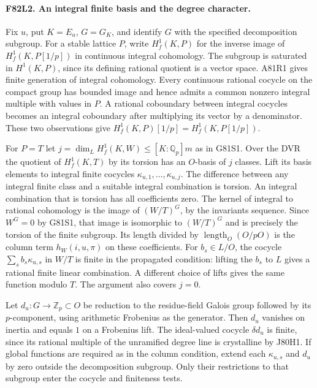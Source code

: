 \paragraph{F82L2. An integral finite basis and the degree character.}
Fix $u$, put $K=E_u$, $G=G_K$, and identify $G$ with the
specified decomposition subgroup. For a stable lattice $P$, write
$H^1_f(K,P)$ for the inverse image of $H^1_f(K,P[1/p])$ in
continuous integral cohomology. The subgroup is saturated in
$H^1(K,P)$, since its defining rational quotient is a vector
space. A81R1 gives finite generation of integral cohomology.
Every continuous rational cocycle on the compact group has bounded
image and hence admits a common nonzero integral multiple with
values in $P$. A rational coboundary between integral cocycles
becomes an integral coboundary after multiplying its vector by
a denominator. These two observations give
$H^1_f(K,P)[1/p]=H^1_f(K,P[1/p])$.

For $P=T$ let $j=\dim_L H^1_f(K,W)\le [K:\mathbb Q_p]m$
as in G81S1. Over the DVR the quotient of $H^1_f(K,T)$ by its
torsion has an $O$-basis of $j$ classes. Lift its basis elements
to integral finite cocycles $\kappa_{u,1},\ldots,\kappa_{u,j}$.
The difference between any integral finite class and a suitable
integral combination is torsion. An integral combination that
is torsion has all coefficients zero. The kernel of integral to
rational cohomology is the image of $(W/T)^G$, by the invariants
sequence. Since $W^G=0$ by G81S1, that image is isomorphic to
$(W/T)^G$ and is precisely the torsion of the finite subgroup.
Its length divided by $\operatorname{length}_O(O/pO)$ is the
column term $h_W(i,u,\pi)$ on these coefficients.
For $b_s\in L/O$, the cocycle $\sum_s b_s\kappa_{u,s}$
in $W/T$ is finite in the propagated condition: lifting the $b_s$
to $L$ gives a rational finite linear combination. A different
choice of lifts gives the same function modulo $T$. The argument
also covers $j=0$.

Let $d_u:G\to\mathbb Z_p\subset O$ be reduction to the
residue-field Galois group followed by its $p$-component,
using arithmetic Frobenius as the generator. Then $d_u$ vanishes
on inertia and equals $1$ on a Frobenius lift. The ideal-valued
cocycle $\delta d_u$ is finite, since its rational multiple of
the unramified degree line is crystalline by J80H1. If global
functions are required as in the column condition, extend each
$\kappa_{u,s}$ and $d_u$ by zero outside the decomposition
subgroup. Only their restrictions to that subgroup enter the
cocycle and finiteness tests.

